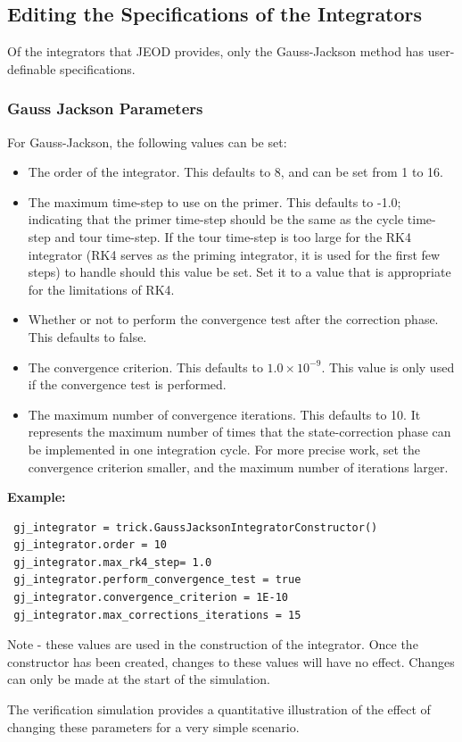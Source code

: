 \subsection{Editing the Specifications of the Integrators}
Of the integrators that JEOD provides, only the Gauss-Jackson method has 
user-definable specifications.  

\subsubsection{Gauss Jackson Parameters}
\label{sec:guide_simuser_gauss_jackson_parameters}
For Gauss-Jackson, the following values can be set:
\begin{itemize}
 \item The order of the integrator.  This defaults to 8, and can be set from 1 
 to 16.
 \item The maximum time-step to use on the primer.  This defaults to -1.0; 
 indicating that the primer time-step should be the same as the cycle 
 time-step and tour time-step.  If the tour time-step is too large for the RK4 
 integrator (RK4 serves as the priming integrator, it is used for the first 
 few steps) to handle should this value be set.  Set it to a value that is 
 appropriate for the limitations of RK4.
 \item Whether or not to perform the convergence test after the correction 
 phase.  This defaults to false.
 \item The convergence criterion.  This defaults to $1.0 \times 10^{-9}$.  This 
 value is only used if the convergence test is performed.
 \item The maximum number of convergence iterations.  This defaults to 10.  It 
 represents the maximum number of times that the state-correction phase can be 
 implemented in one integration cycle.  For more precise work, set the 
 convergence criterion smaller, and the maximum number of iterations larger.
\end{itemize}

\textbf{Example:}
\begin{verbatim}
 gj_integrator = trick.GaussJacksonIntegratorConstructor()
 gj_integrator.order = 10
 gj_integrator.max_rk4_step= 1.0
 gj_integrator.perform_convergence_test = true
 gj_integrator.convergence_criterion = 1E-10
 gj_integrator.max_corrections_iterations = 15

\end{verbatim}

Note - these values are used in the construction of the integrator.  Once the 
constructor has been created, changes to these values will have no effect.  
Changes can only be made at the start of the simulation.

The verification simulation  
provides a quantitative 
illustration of the effect of changing these parameters for a very simple 
scenario.

